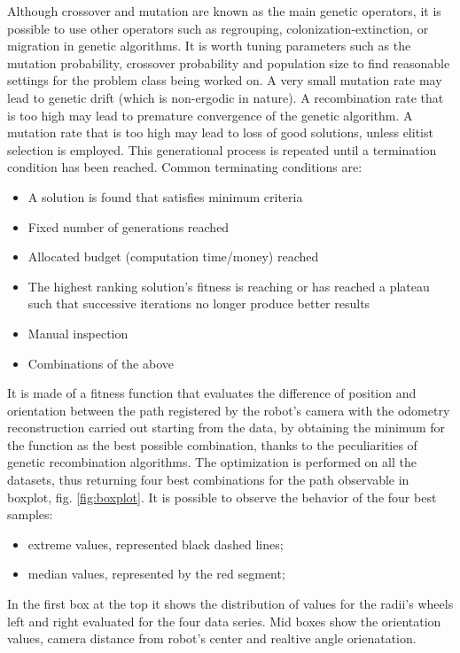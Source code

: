Although crossover and mutation are known as the main genetic operators, it is possible to use other operators such as regrouping, colonization-extinction, or migration in genetic algorithms.
It is worth tuning parameters such as the mutation probability, crossover probability and population size to find reasonable settings for the problem class being worked on. A very small mutation rate may lead to genetic drift (which is non-ergodic in nature). A recombination rate that is too high may lead to premature convergence of the genetic algorithm. A mutation rate that is too high may lead to loss of good solutions, unless elitist selection is employed.
This generational process is repeated until a termination condition has been reached. Common terminating conditions are:
\begin{itemize}
\item A solution is found that satisfies minimum criteria
\item Fixed number of generations reached
\item Allocated budget (computation time/money) reached
\item The highest ranking solution's fitness is reaching or has reached a plateau such that successive iterations no longer produce better results
\item Manual inspection
\item Combinations of the above
\end{itemize}
\noindent It is made of a fitness function that evaluates the difference of position and orientation between the path registered by the robot's camera with the odometry reconstruction carried out starting from the data, by obtaining the minimum for the function as the best possible combination, thanks to the peculiarities of genetic recombination algorithms.
The optimization is performed on all the datasets, thus returning four best combinations for the path observable in boxplot, fig. \ref{fig:boxplot}. It is possible to observe the behavior of the four best samples:
\begin{itemize}
\item extreme values, represented black dashed lines;
\item median values, represented by the red segment;
\end{itemize}
In the first box at the top it shows the distribution of values for the radii's wheels left and right evaluated for the four data series.
Mid boxes show the orientation values, camera distance from robot's center and realtive angle orienatation.
